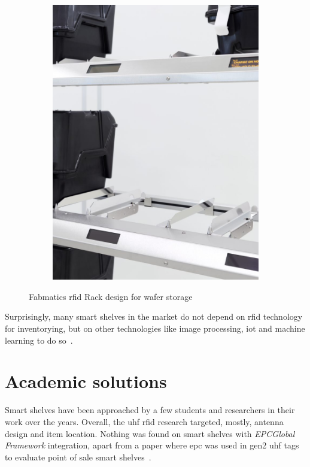 \begin{figure}[!ht]
\begin{subfigure}{.45\textwidth}
        \includegraphics[width=\linewidth]{./figs/02-state-of-the-art/fabmaticsrfidrack3.jpg}
    \end{subfigure}
    \caption[Fabmatics \ac{rfid} Rack design for wafer storage]{Fabmatics \ac{rfid} Rack design for wafer storage~\cite{RFIDRackFabmatics}} 
    \label{fig:fabmaticsrfidrack}
\end{figure}

Surprisingly, many smart shelves in the market do not depend on \ac{rfid} technology for inventorying, but on other technologies like image processing, \ac{iot} and machine learning to do so~\cite{TechnologyWiseShelf, RetailSolutionsAWM}.

\section{Academic solutions} \label{sec:academicsolutions}

Smart shelves have been approached by a few students and researchers in their work over the years. Overall, the \ac{uhf} \ac{rfid} research targeted, mostly, antenna design and item location. Nothing was found on smart shelves with \emph{EPCGlobal Framework} integration, apart from a paper where \ac{epc} was used in \ac{gen2} \acs{uhf} tags to evaluate point of sale smart shelves~\cite{sousaSmartShelfRFIDLean2010}.

